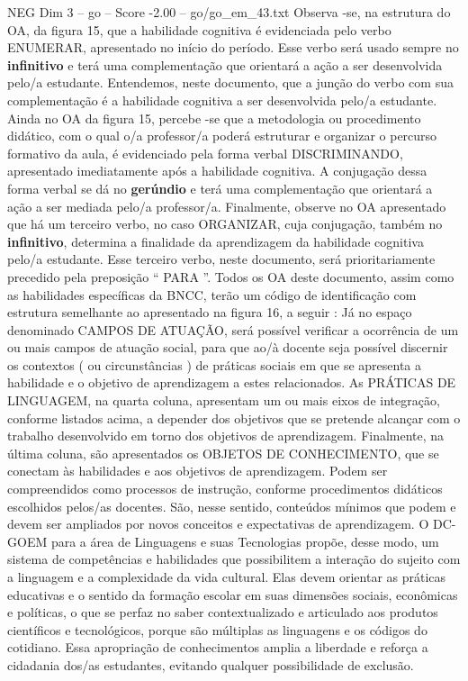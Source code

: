 \begin{textsample}{NEG Dim 3 – go – Score -2.00 – go/go\_em\_43.txt}  \label{ex:f3_neg_243}
Observa -se, na estrutura do OA, da figura 15, que a habilidade cognitiva é evidenciada pelo verbo ENUMERAR, apresentado no início do período.
Esse verbo será usado sempre no \textbf{infinitivo} e terá uma complementação que orientará a ação a ser desenvolvida pelo/a estudante.
Entendemos, neste documento, que a junção do verbo com sua complementação é a habilidade cognitiva a ser desenvolvida pelo/a estudante.
Ainda no OA da figura 15, percebe -se que a metodologia ou procedimento didático, com o qual o/a professor/a poderá estruturar e organizar o percurso formativo da aula, é evidenciado pela forma verbal DISCRIMINANDO, apresentado imediatamente após a habilidade cognitiva.
A conjugação dessa forma verbal se dá no \textbf{gerúndio} e terá uma complementação que orientará a ação a ser mediada pelo/a professor/a.
Finalmente, observe no OA apresentado que há um terceiro verbo, no caso ORGANIZAR, cuja conjugação, também no \textbf{infinitivo}, determina a finalidade da aprendizagem da habilidade cognitiva pelo/a estudante.
Esse terceiro verbo, neste documento, será prioritariamente precedido pela preposição “ PARA ”.
Todos os OA deste documento, assim como as habilidades específicas da BNCC, terão um código de identificação com estrutura semelhante ao apresentado na figura 16, a seguir : Já no espaço denominado CAMPOS DE ATUAÇÃO, será possível verificar a ocorrência de um ou mais campos de atuação social, para que ao/à docente seja possível discernir os contextos ( ou circunstâncias ) de práticas sociais em que se apresenta a habilidade e o objetivo de aprendizagem a estes relacionados.
As PRÁTICAS DE LINGUAGEM, na quarta coluna, apresentam um ou mais eixos de integração, conforme listados acima, a depender dos objetivos que se pretende alcançar com o trabalho desenvolvido em torno dos objetivos de aprendizagem.
Finalmente, na última coluna, são apresentados os OBJETOS DE CONHECIMENTO, que se conectam às habilidades e aos objetivos de aprendizagem.
Podem ser compreendidos como processos de instrução, conforme procedimentos didáticos escolhidos pelos/as docentes.
São, nesse sentido, conteúdos mínimos que podem e devem ser ampliados por novos conceitos e expectativas de aprendizagem.
O DC-GOEM para a área de Linguagens e suas Tecnologias propõe, desse modo, um sistema de competências e habilidades que possibilitem a interação do sujeito com a linguagem e a complexidade da vida cultural.
Elas devem orientar as práticas educativas e o sentido da formação escolar em suas dimensões sociais, econômicas e políticas, o que se perfaz no saber contextualizado e articulado aos produtos científicos e tecnológicos, porque são múltiplas as linguagens e os códigos do cotidiano.
Essa apropriação de conhecimentos amplia a liberdade e reforça a cidadania dos/as estudantes, evitando qualquer possibilidade de exclusão.

\end{textsample}
